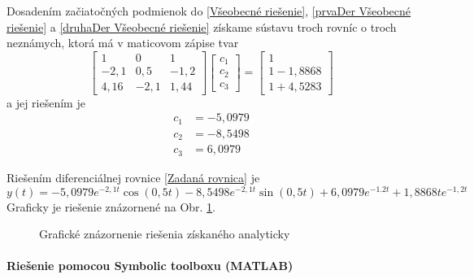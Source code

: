 \documentclass[a4paper, 10pt, ]{article}
\begin{document}
Dosadením začiatočných podmienok do \eqref{Všeobecné riešenie}, \eqref{prvaDer Všeobecné riešenie} a \eqref{druhaDer Všeobecné riešenie} získame sústavu troch rovníc o troch neznámych, ktorá má v maticovom zápise tvar
\begin{equation}
	\begin{bmatrix}
		   1 &    0 &    1 \\
		-2,1 &  0,5 & -1,2 \\
		4,16 & -2,1 & 1,44
	\end{bmatrix}
	\begin{bmatrix}
		c_1 \\
		c_2 \\
		c_3
	\end{bmatrix}
	=
	\begin{bmatrix}
		1 \\
		1-1,8868 \\
		1+4,5283
	\end{bmatrix}
\end{equation}
a jej riešením je
\begin{subequations}
	\begin{align}
		c_1 &= -5,0979\\
		c_2 &= -8,5498\\
		c_3 &=  6,0979
	\end{align}
\end{subequations}




Riešením diferenciálnej rovnice \eqref{Zadaná rovnica} je
\begin{equation}
	y(t) = -5,0979 e^{-2,1t} \cos(0,5t)  -8,5498 e^{-2,1t} \sin(0,5t) + 6,0979 e^{-1.2t} + 1,8868 t e^{-1,2 t}
\end{equation}
Graficky je riešenie znázornené na Obr. \ref{Grafické znázornenie riešenia získaného analyticky}.


\begin{figure}[!ht]
	\centering


	\caption{Grafické znázornenie riešenia získaného analyticky}
	\label{Grafické znázornenie riešenia získaného analyticky}
\end{figure}









\paragraph{Riešenie pomocou Symbolic toolboxu (MATLAB)}
\end{document}
